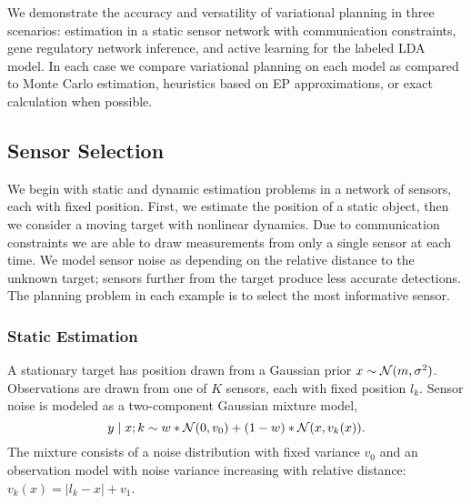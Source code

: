 We demonstrate the accuracy and versatility of variational planning in
three scenarios: estimation in a static sensor network with
communication constraints, gene regulatory network inference, and
active learning for the labeled LDA model.  In each case we compare
variational planning on each model as compared to Monte Carlo
estimation, heuristics based on EP approximations, or exact
calculation when possible.  





\subsection{Sensor Selection}

We begin with static and dynamic estimation problems in a network of
sensors, each with fixed position.  First, we estimate the position of
a static object, then we consider a moving target with nonlinear
dynamics.  Due to communication constraints we are able to draw
measurements from only a single sensor at each time.  We model sensor
noise as depending on the relative distance to the unknown target;
sensors further from the target produce less accurate detections.  The
planning problem in each example is to select the most informative
sensor.

\subsubsection{Static Estimation}

A stationary target has position drawn from a Gaussian prior $x \sim
\mathcal{N}(m,\sigma^2)$.  Observations are drawn from
one of $K$ sensors, each with fixed position $l_k$.  Sensor noise is
modeled as a two-component Gaussian mixture model,
\[
  y \mid x; k \sim w * \mathcal{N}(0, v_0) + (1-w) * \mathcal{N}(x, v_k(x)).
\]
The mixture consists of a noise distribution with fixed variance $v_0$
and an observation model with noise variance increasing with relative
distance: \mbox{$v_k(x) = |l_k - x| + v_1$}.

